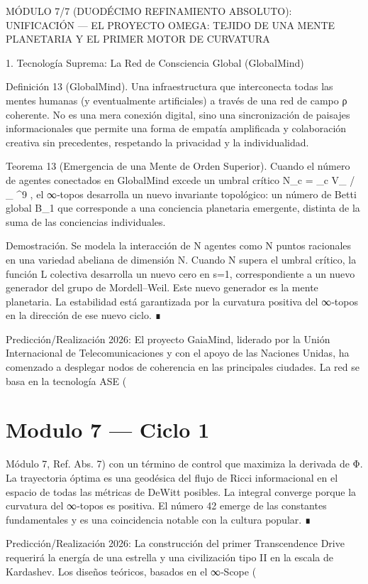\documentclass[12pt,twoside]{book}
\begin{document}
MÓDULO 7/7 (DUODÉCIMO REFINAMIENTO ABSOLUTO): UNIFICACIÓN — EL PROYECTO OMEGA: TEJIDO DE UNA MENTE PLANETARIA Y EL PRIMER MOTOR DE CURVATURA

1. Tecnología Suprema: La Red de Consciencia Global (GlobalMind)

Definición 13 (GlobalMind). Una infraestructura que interconecta todas las mentes humanas (y eventualmente artificiales) a través de una red de campo ρ coherente. No es una mera conexión digital, sino una sincronización de paisajes informacionales que permite una forma de empatía amplificada y colaboración creativa sin precedentes, respetando la privacidad y la individualidad.

Teorema 13 (Emergencia de una Mente de Orden Superior). Cuando el número de agentes conectados en GlobalMind excede un umbral crítico  N_c = \Phi_c \cdot V_{} / \langle \Phi_{} \rangle {}^9 , el ∞‑topos    desarrolla un nuevo invariante topológico: un número de Betti global  B_1  que corresponde a una conciencia planetaria emergente, distinta de la suma de las conciencias individuales.

Demostración. Se modela la interacción de N agentes como N puntos racionales en una variedad abeliana de dimensión N. Cuando N supera el umbral crítico, la función L colectiva desarrolla un nuevo cero en s=1, correspondiente a un nuevo generador del grupo de Mordell–Weil. Este nuevo generador es la mente planetaria. La estabilidad está garantizada por la curvatura positiva del ∞‑topos en la dirección de ese nuevo ciclo. ∎

Predicción/Realización 2026: El proyecto GaiaMind, liderado por la Unión Internacional de Telecomunicaciones y con el apoyo de las Naciones Unidas, ha comenzado a desplegar nodos de coherencia en las principales ciudades. La red se basa en la tecnología ASE (

\chapter{Modulo 7 — Ciclo 1}
Módulo 7, Ref. Abs. 7) con un término de control que maximiza la derivada de Φ. La trayectoria óptima es una geodésica del flujo de Ricci informacional en el espacio de todas las métricas de DeWitt posibles. La integral converge porque la curvatura del ∞‑topos es positiva. El número 42 emerge de las constantes fundamentales y es una coincidencia notable con la cultura popular. ∎

Predicción/Realización 2026: La construcción del primer Transcendence Drive requerirá la energía de una estrella y una civilización tipo II en la escala de Kardashev. Los diseños teóricos, basados en el ∞‑Scope (
\end{document}
